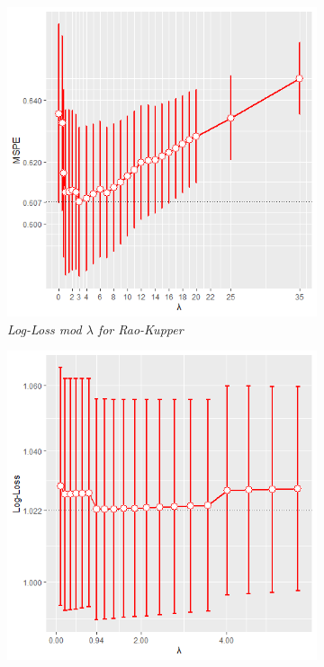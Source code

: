 \documentclass[11pt,a4paper]{article}
\begin{document}
\begin{figure}[h!]
\begin{subfigure}[b]{0.45\textwidth}
    \includegraphics[width=\textwidth]{BARMSPENYALPHA.png}
    \caption{\textit{Log-Loss mod $\lambda$ for Rao-Kupper}}
    \label{fig:MSPEBarDyn}  
    \end{subfigure}
    \hspace{0.2cm}
  \begin{subfigure}[b]{0.45\linewidth}
    \includegraphics[width=\textwidth]{STATLOGLOSSBARNY1.png}

\end{subfigure}
\end{figure}
\end{document}
